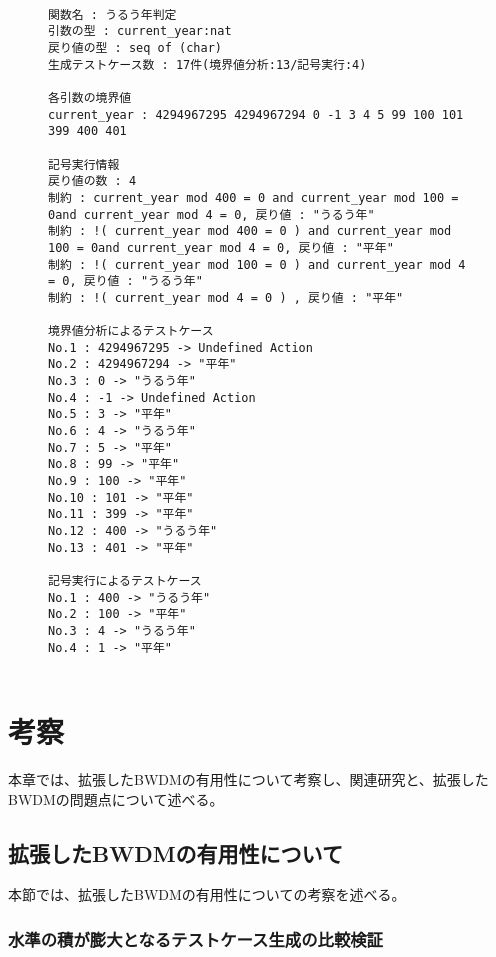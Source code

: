 \documentclass[uplatex, report, a4j, 10pt]{jsbook}
\begin{document}
\lstset{language=}
\begin{figure}[tp]
  \begin{lstlisting}[caption=拡張したBWDMに操作定義を含む仕様(コード\ref{fig:multiple_definition})を適用した際の出力,label=fig:extended_multiple_definition]

関数名 : うるう年判定
引数の型 : current_year:nat 
戻り値の型 : seq of (char)
生成テストケース数 : 17件(境界値分析:13/記号実行:4)

各引数の境界値
current_year : 4294967295 4294967294 0 -1 3 4 5 99 100 101 399 400 401 

記号実行情報
戻り値の数 : 4
制約 : current_year mod 400 = 0 and current_year mod 100 = 0and current_year mod 4 = 0, 戻り値 : "うるう年"
制約 : !( current_year mod 400 = 0 ) and current_year mod 100 = 0and current_year mod 4 = 0, 戻り値 : "平年"
制約 : !( current_year mod 100 = 0 ) and current_year mod 4 = 0, 戻り値 : "うるう年"
制約 : !( current_year mod 4 = 0 ) , 戻り値 : "平年"

境界値分析によるテストケース
No.1 : 4294967295 -> Undefined Action
No.2 : 4294967294 -> "平年"
No.3 : 0 -> "うるう年"
No.4 : -1 -> Undefined Action
No.5 : 3 -> "平年"
No.6 : 4 -> "うるう年"
No.7 : 5 -> "平年"
No.8 : 99 -> "平年"
No.9 : 100 -> "平年"
No.10 : 101 -> "平年"
No.11 : 399 -> "平年"
No.12 : 400 -> "うるう年"
No.13 : 401 -> "平年"

記号実行によるテストケース
No.1 : 400 -> "うるう年"
No.2 : 100 -> "平年"
No.3 : 4 -> "うるう年"
No.4 : 1 -> "平年"
    
\end{lstlisting}
\end{figure}

\chapter{考察}\label{cha:Evaluation}
本章では、拡張したBWDMの有用性について考察し、関連研究と、拡張したBWDMの問題点について述べる。

\section{拡張したBWDMの有用性について}
本節では、拡張したBWDMの有用性についての考察を述べる。

\subsection{水準の積が膨大となるテストケース生成の比較検証}
\end{document}
